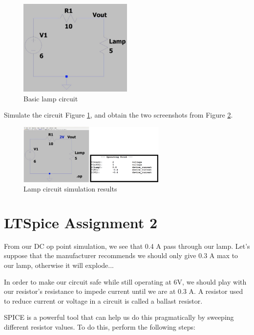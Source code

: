 \documentclass{article}
\begin{document}
\begin{figure}[h]
\centering
\includegraphics[width=0.5\textwidth]{lab1_fig-2}
\caption{Basic lamp circuit}
\label{fig:assignment1}
\end{figure}

Simulate the circuit Figure \ref{fig:assignment1}, and obtain the two
screenshots from Figure \ref{fig:assignment1_results}.

\begin{figure}[h]
\centering
\includegraphics[width=0.65\textwidth]{lab1_fig-3}
\caption{Lamp circuit simulation results}
\label{fig:assignment1_results}
\end{figure}

\section*{LTSpice Assignment 2}

From our DC op point simulation, we see that 0.4 A pass through our lamp. Let's suppose that the manufacturer recommends we should only give 0.3 A max to our lamp, otherwise it will explode...

In order to make our circuit safe while still operating at 6V, we should play with our resistor's resistance to impede current until we are at 0.3 A. A resistor used to reduce current or voltage in a circuit is called a ballast resistor.

SPICE is a powerful tool that can help us do this pragmatically by sweeping different resistor values. To do this, perform the following steps:
\end{document}
